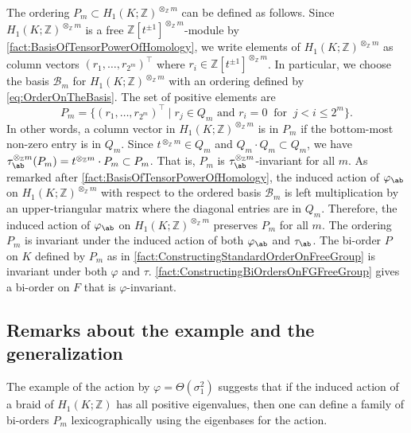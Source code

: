\documentclass{amsart}
\begin{document}
The ordering $P_m \subset H_1(K;\mathbb{Z})^{\otimes_\mathbb{Z} m}$ can be defined as follows. Since $H_1(K;\mathbb{Z})^{\otimes_\mathbb{Z} m}$ is a free $\mathbb{Z}[t^{\pm 1}]^{\otimes_\mathbb{Z} m}$-module by \cref{fact:BasisOfTensorPowerOfHomology}, we write elements of $H_1(K;\mathbb{Z})^{\otimes_\mathbb{Z} m}$ as column vectors $\left(r_1, \dots, r_{2^m} \right)^\top$ where $r_i \in \mathbb{Z}[t^{\pm 1}]^{\otimes_\mathbb{Z} m}$. In particular, we choose the basis $\mathcal{B}_m$ for $H_1(K;\mathbb{Z})^{\otimes_\mathbb{Z} m}$ with an ordering defined by \cref{eq:OrderOnTheBasis}. The set of positive elements are
\[
P_m = \{\left(r_1, \dots, r_{2^m} \right)^\top \mid r_j \in Q_m \text{ and } r_i = 0 \ \text{ for } \ j< i\leq 2^m \}.
\]
In other words, a column vector in $H_1(K;\mathbb{Z})^{\otimes_\mathbb{Z} m}$ is in $P_m$ if the bottom-most non-zero entry is in $Q_m$. Since $t^{\otimes_\mathbb{Z} m} \in Q_m$ and  $Q_m \cdot Q_m \subset Q_m$, we have $\tau_{\ab}^{\otimes_\mathbb{Z} m}(P_m) = t^{\otimes_\mathbb{Z} m} \cdot P_m \subset P_m$. That is, $P_m$ is $\tau_{\ab}^{\otimes_\mathbb{Z} m}$-invariant for all $m$. As remarked after \cref{fact:BasisOfTensorPowerOfHomology}, the induced action of $\varphi_{\ab}$ on $H_1(K;\mathbb{Z})^{\otimes_\mathbb{Z} m}$ with respect to the ordered basis $\mathcal{B}_m$ is left multiplication by an upper-triangular matrix where the diagonal entries are in $Q_m$. Therefore, the induced action of $\varphi_{\ab}$ on $H_1(K;\mathbb{Z})^{\otimes_\mathbb{Z} m}$ preserves $P_m$ for all $m$. The ordering $P_m$ is invariant under the induced action of both $\varphi_{\ab}$ and $\tau_{\ab}$. The bi-order $P$ on $K$ defined by $P_m$ as in \cref{fact:ConstructingStandardOrderOnFreeGroup} is invariant under both $\varphi$ and $\tau$. \cref{fact:ConstructingBiOrdersOnFGFreeGroup} gives a bi-order on $F$ that is $\varphi$-invariant. 

\subsection{Remarks about the example and the generalization}
The example of the action by $\varphi = \Theta(\sigma_1^2)$ suggests that if the induced action of a braid of $H_1(K;\mathbb{Z})$ has all positive eigenvalues, then one can define a family of bi-orders $P_m$ lexicographically using the eigenbases for the action. 
\end{document}
